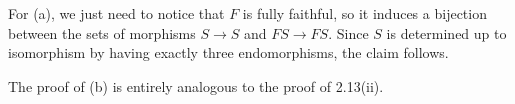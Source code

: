 For (a), we just need to notice that $F$ is fully faithful, so it induces a
bijection between the sets of morphisms $S\to S$ and $FS \to FS$. Since $S$ is
determined up to isomorphism by having exactly three endomorphisms, the claim
follows.

The proof of (b) is entirely analogous to the proof of 2.13(ii).
